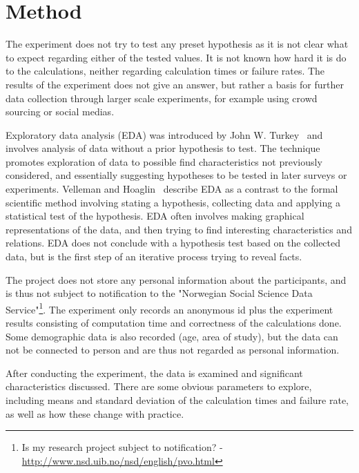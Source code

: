 \section{Method}
The experiment does not try to test any preset hypothesis as it is not clear what to expect regarding either of the tested values. It is not known how hard it is do to the calculations, neither regarding calculation times or failure rates. The results of the experiment does not give an answer, but rather a basis for further data collection through larger scale experiments, for example using crowd sourcing or social medias.

\par Exploratory data analysis (EDA) was introduced by John W. Turkey~\cite{turkey} and involves analysis of data without a prior hypothesis to test. The technique promotes exploration of data to possible find characteristics not previously considered, and essentially suggesting hypotheses to be tested in later surveys or experiments. Velleman and Hoaglin~\cite{exploratory-analysis} describe EDA as a contrast to the formal scientific method involving stating a hypothesis, collecting data and applying a statistical test of the hypothesis. EDA often involves making graphical representations of the data, and then trying to find interesting characteristics and relations. EDA does not conclude with a hypothesis test based on the collected data, but is the first step of an iterative process trying to reveal facts. 

\begin{remark}
 The project does not store any personal information about the participants, and is thus not subject to notification to the "Norwegian Social Science Data Service"\footnote{Is my research project subject to notification? - \url{http://www.nsd.uib.no/nsd/english/pvo.html}}. The experiment only records an anonymous id plus the experiment results consisting of computation time and correctness of the calculations done. Some demographic data is also recorded (age, area of study), but the data can not be connected to person and are thus not regarded as personal information.
 \end{remark}

\par After conducting the experiment, the data is examined and significant characteristics discussed. There are some obvious parameters to explore, including means and standard deviation of the calculation times and failure rate, as well as how these change with practice. 

